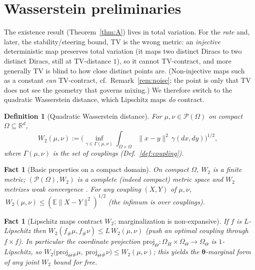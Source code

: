 \documentclass[11pt]{article}
\theoremstyle{definitionbreak}
\newtheorem{definition}{Definition}[section]
\theoremstyle{plainbreak}
\newtheorem{fact}[theorem]{Fact}
\theoremstyle{remarkbreak}
\newcommand{\R}{\mathbb{R}}
\newcommand{\E}{\mathbb{E}}
\newcommand{\cP}{\mathcal{P}}
\newcommand{\Om}{\Omega}
\newcommand{\bth}{\bm{\theta}}
\newcommand{\push}{{}_{\#}}
\newcommand{\norm}[1]{\lVert #1 \rVert}
\begin{document}
\section{Wasserstein preliminaries}
\label{sec:wass}

The existence result (Theorem~\ref{thm:A}) lives in total variation. For the \emph{rate} and, later,
the stability/steering bound, TV is the wrong metric: an \emph{injective} deterministic map preserves
total variation (it maps two distinct Diracs to two distinct Diracs, still at TV-distance $1$), so it
cannot TV-contract, and more generally TV is blind to how close distinct points are. (Non-injective
maps such as a constant \emph{can} TV-contract, cf.\ Remark~\ref{rem:noise}; the point is only that TV
does not see the geometry that governs mixing.) We therefore switch to the quadratic Wasserstein
distance, which Lipschitz maps \emph{do} contract.

\begin{definition}[Quadratic Wasserstein distance]
\label{def:w2}
For $\mu,\nu\in\cP(\Om)$ on compact $\Om\subseteq\R^d$,
\[
  W_2(\mu,\nu):=\Big(\inf_{\gamma\in\Gamma(\mu,\nu)}\int_{\Om\times\Om}\norm{x-y}^2\,\gamma(dx,dy)\Big)^{1/2},
\]
where $\Gamma(\mu,\nu)$ is the set of couplings (Def.~\ref{def:coupling}).
\end{definition}

\begin{fact}[Basic properties on a compact domain]
\label{fact:w2basic}
On compact $\Om$, $W_2$ is a finite metric; $(\cP(\Om),W_2)$ is a complete (indeed compact) metric
space and $W_2$ metrizes weak convergence \cite[Ch.~6]{Villani}. For \emph{any} coupling $(X,Y)$ of
$\mu,\nu$, $\ W_2(\mu,\nu)\le(\E\norm{X-Y}^2)^{1/2}$ (the infimum is over couplings).
\end{fact}

\begin{fact}[Lipschitz maps contract $W_2$; marginalization is non-expansive]
\label{fact:w2lip}
If $f$ is $L$-Lipschitz then $W_2(f\push\mu,f\push\nu)\le L\,W_2(\mu,\nu)$ (push an optimal coupling
through $f\times f$). In particular the coordinate projection
$\mathrm{proj}_\Theta:\Om_H\times\Om_\Theta\to\Om_\Theta$ is $1$-Lipschitz, so
$W_2\big(\mathrm{proj}_\Theta\push\mu,\ \mathrm{proj}_\Theta\push\nu\big)\le W_2(\mu,\nu)$; this yields
the $\bth$-marginal form of any joint $W_2$ bound for free.
\end{fact}
\end{document}
